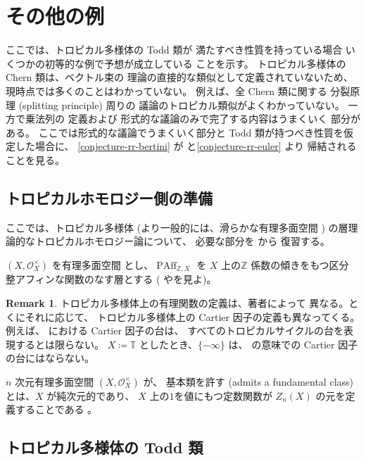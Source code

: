 \documentclass[a4paper,dvipdfmx,reqno,12pt]{amsart}
\theoremstyle{definition}
\newtheorem{remark}[theorem]{Remark}
\newcommand{\deq}{\coloneqq}
\newcommand{\opn}[1]{\operatorname{#1}}
\numberwithin{equation}{section}
\begin{document}
\section{その他の例}

ここでは、トロピカル多様体の Todd 類が
満たすべき性質を持っている場合
いくつかの初等的な例で予想が成立している
ことを示す。
トロピカル多様体の Chern 類は、ベクトル束の
理論の直接的な類似として定義されていないため、
現時点では多くのことはわかっていない。
例えば、全 Chern 類に関する
分裂原理 (splitting principle) 周りの
議論のトロピカル類似がよくわかっていない。
一方で乗法列\cite[]{MR1335917}の
定義および
形式的な議論のみで完了する内容はうまくいく
部分がある。
ここでは形式的な議論でうまくいく部分と
Todd 類が持つべき性質を仮定した場合に、
\cref{conjecture-rr-bertini} 
が\cite[Conjecture 6.13]{demedrano2023chern}
と\cref{conjecture-rr-euler} より
帰結されることを見る。



\subsection{トロピカルホモロジー側の準備}

ここでは、トロピカル多様体 
(より一般的には、滑らかな有理多面空間
\cite[Definition 6.1]{MR4637248})
の層理論的なトロピカルホモロジー論について、
必要な部分を \cite{MR4637248} から
復習する。

$(X,\mathcal{O}_X^{\times})$ を有理多面空間
とし、$\opn{PAff}_{\mathbb{Z},X}$ を
$X$ 上の$\mathbb{Z}$ 係数の傾きをもつ区分
整アフィンな関数のなす層とする
(\cite[Definition 4.1]{MR3894860}
や\cite[Definition 3.8 and Remark
3.9]{MR4246795}を見よ)。

\begin{remark}
トロピカル多様体上の有理関数の定義は、著者によって
異なる。とくにそれに応じて、
トロピカル多様体上の Cartier 因子の定義も異なってくる。
例えば、\cite{MR3894860,MR4637248}
における Cartier 因子の台は、
すべてのトロピカルサイクルの台を表現するとは限らない。
$X\deq \mathbb{T}$ としたとき、$\{-\infty\}$
は、\cite{MR3894860,MR4637248} の意味での
Cartier 因子の台にはならない。
\end{remark}


$n$ 次元有理多面空間
$(X,\mathcal{O}_X^{\times})$ が、
基本類を許す
(admits a fundamental class)
とは、$X$ が純次元的であり、
$X$ 上の$1$を値にもつ定数関数が
$Z_n(X)$ の元を定義することである
\cite[]{MR4246795}。


\subsection{トロピカル多様体の Todd 類}
\end{document}
